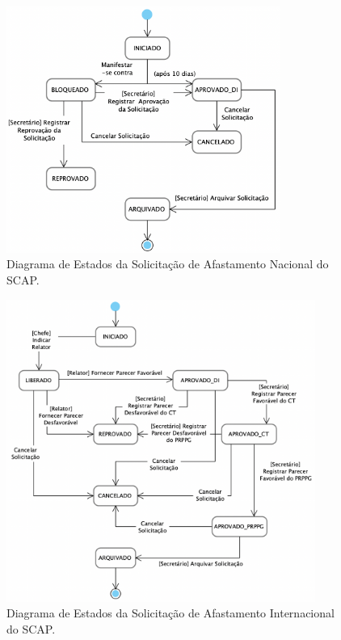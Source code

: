 \begin{figure}[h!]
    \centering
    \includegraphics[width=0.8\textwidth]{figuras/fig-diagrama-estado-nacional.png}
    \caption{Diagrama de Estados da Solicitação de Afastamento Nacional do SCAP.}
    \label{fig-diagrama-estado-nacional}
\end{figure}


\begin{figure}[h!]
    \centering
    \includegraphics[width=0.9\textwidth]{figuras/fig-diagrama-estado-internacional.png}
    \caption{Diagrama de Estados da Solicitação de Afastamento Internacional do SCAP.}
    \label{fig-diagrama-estado-internacional}
\end{figure}

